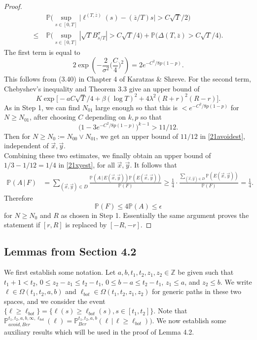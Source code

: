 \documentclass[12pt]{article}
\begin{document}
\begin{proof}
	\begin{align*}
	&\mathbb{P} \Big(\sup_{s\in[0,T]} \big|\ell^{(T,\overline{z})}(s) - (\overline{z}/T)s\big| > C\sqrt{T}/2\Big)\\
	\leq \; & \mathbb{P}\Big(\sup_{s\in[0,T]} |\sqrt{T}B^{\sigma}_{s/T}| > C\sqrt{T}/4\Big) + \mathbb{P}\Big(\Delta(T,\overline{z}) > C\sqrt{T}/4\Big).
	\end{align*}
	The first term is equal to
	\[
	2\exp\left(-\frac{2}{\sigma^2}\Big(\frac{C}{4}\Big)^2\right) = 2e^{-C^2/8p(1-p)}.
	\]
	This follows from (3.40) in Chapter 4 of Karatzas \& Shreve. For the second term, Chebyshev's inequality and Theorem 3.3 give an upper bound of
	\[
	K\exp\Big[-aC\sqrt{T}/4 + \beta(\log T)^2 + 4\lambda^2(R+r)^2(R-r) \Big].
	\]
	As in Step 1, we can find $N_{01}$ large enough so that this is $<e^{-C^2/8p(1-p)}$ for $N\geq N_{01}$, after choosing $C$ depending on $k,p$ so that
	\begin{equation}
	\big(1-3e^{-C^2/8p(1-p)}\big)^{k-1} > 11/12. \label{21Cineq}
	\end{equation}
	Then for $N\geq N_0 := N_{00} \vee N_{01}$, we get an upper bound of $11/12$ in \eqref{21avoidest}, independent of $\vec{x},\vec{y}$.\\
	
	Combining these two estimates, we finally obtain an upper bound of $1/3 - 1/12 = 1/4$ in \eqref{21xyest}, for all $\vec{x},\vec{y}$. It follows that
	\begin{align*}
	\mathbb{P}(A\,|\,F) &= \sum_{(\vec{x},\vec{y})\in D} \frac{\mathbb{P}(A\,|\,E(\vec{x},\vec{y}))\mathbb{P}(E(\vec{x},\vec{y}))}{\mathbb{P}(F)} \geq \frac{1}{4}\cdot\frac{\sum_{(\vec{x},\vec{y})\in D} \mathbb{P}(E(\vec{x},\vec{y}))}{\mathbb{P}(F)} = \frac{1}{4}.
	\end{align*}
	Therefore
	\[
	\mathbb{P}(F) \leq 4\mathbb{P}(A) \leq \epsilon
	\]
	for $N\geq N_0$ and $R$ as chosen in Step 1. Essentially the same argument proves the statement if $[r,R]$ is replaced by $[-R,-r]$.
	
	\end{proof}


\subsection*{Lemmas from Section 4.2}

	
	We first establish some notation. Let $a,b,t_1,t_2,z_1,z_2 \in \mathbb{Z}$ be given such that $t_1 + 1 < t_2$, $0\leq z_2 - z_1 \leq t_2 - t_1$, $0\leq b-a \leq t_2 - t_1$, $z_1\leq a$, and $z_2\leq b$. We write $\ell\in\Omega(t_1,t_2,a,b)$ and $\ell_{bot}\in\Omega(t_1,t_2,z_1,z_2)$ for generic paths in these two spaces, and we consider the event $\{\ell \geq \ell_{bot}\} = \{\ell(s) \geq \ell_{bot}(s), s\in[t_1,t_2]\}$. Note that $\mathbb{P}^{t_1,t_2,a,b,\infty,\ell_{bot}}_{avoid,Ber}(\ell) = \mathbb{P}^{t_1,t_2,a,b}_{Ber}(\ell\,|\,\ell \geq \ell_{bot}))$. We now establish some auxiliary results which will be used in the proof of Lemma 4.2.
	
\end{document}
